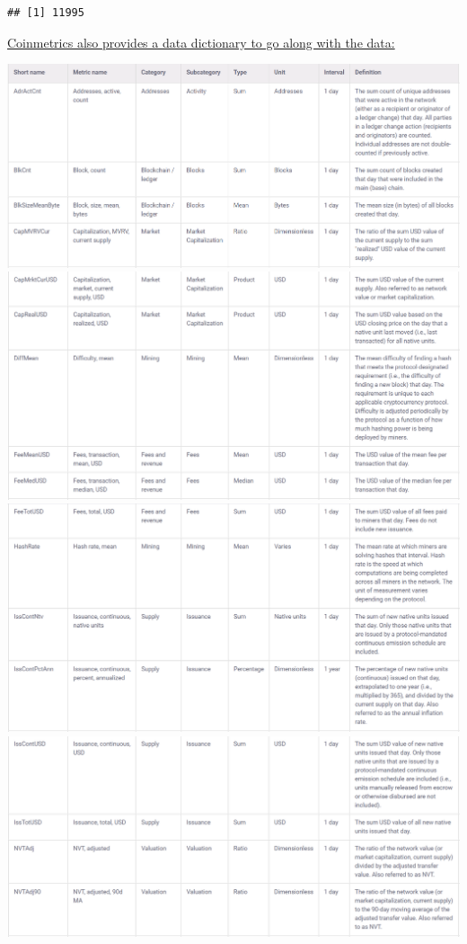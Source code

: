 \documentclass[
]{book}
\begin{document}
\begin{verbatim}
## [1] 11995
\end{verbatim}

\href{https://coinmetrics.io/community-data-dictionary/}{Coinmetrics also provides a data dictionary to go along with the data:}

\includegraphics{images/coinmetrics_datadictionary1.png}
\includegraphics{images/coinmetrics_datadictionary2.png}
\includegraphics{images/coinmetrics_datadictionary3.png}
\includegraphics{images/coinmetrics_datadictionary4.png}
\end{document}
